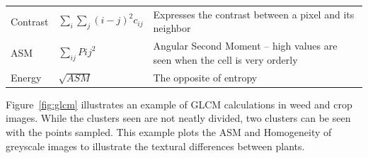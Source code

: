 \documentclass[letterpaper]{article}
\begin{document}
{\begin{longtable}{x{\dimexpr.15\tabcolsep}
                  x{\dimexpr.225\tabcolsep}
                  x{\dimexpr.625\tabcolsep}}
		Contrast      
		& $\sum_{i}\sum_{j}{(i - j)}^2 c_{ij}$ 
		& Expresses the contrast between a pixel and its neighbor
\tabularnewline\addlinespace

		ASM      
		& $\sum_{ij}P{ij}^2$
		& Angular Second Moment -- high values are seen when the cell is very orderly
\tabularnewline\addlinespace

		Energy   
		& $\sqrt{ASM}$ 
		& The opposite of entropy
\label{table:glcm-formulae}
\end{longtable}

Figure~\ref{fig:glcm} illustrates an example of GLCM calculations in weed and crop images. While the clusters seen are not neatly divided, two clusters can be seen with the points sampled. This example plots the ASM and Homogeneity of greyscale images to illustrate the textural differences between plants.

}
\end{document}
